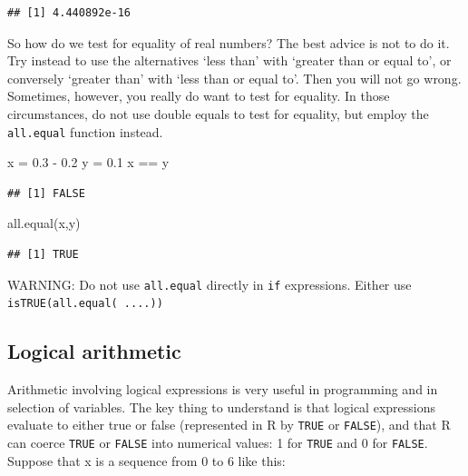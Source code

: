 \documentclass[
]{book}
\newenvironment{Shaded}{\begin{snugshade}}{\end{snugshade}}
\newcommand{\FloatTok}[1]{\textcolor[rgb]{0.00,0.00,0.81}{#1}}
\newcommand{\FunctionTok}[1]{\textcolor[rgb]{0.00,0.00,0.00}{#1}}
\newcommand{\NormalTok}[1]{#1}
\newcommand{\OtherTok}[1]{\textcolor[rgb]{0.56,0.35,0.01}{#1}}
\newcommand{\SpecialCharTok}[1]{\textcolor[rgb]{0.00,0.00,0.00}{#1}}
\begin{document}
\begin{verbatim}
## [1] 4.440892e-16
\end{verbatim}

So how do we test for equality of real numbers? The best advice is not to do it. Try instead to use the alternatives `less than' with `greater than or equal to', or conversely `greater than' with `less than or equal to'. Then you will not go wrong. Sometimes, however, you really do want to test for equality. In those circumstances, do not use double equals to test for equality, but employ the \texttt{all.equal} function instead.

\begin{Shaded}
\begin{Highlighting}[]
\NormalTok{x }\OtherTok{=} \FloatTok{0.3} \SpecialCharTok{{-}} \FloatTok{0.2}
\NormalTok{y }\OtherTok{=} \FloatTok{0.1}
\NormalTok{x }\SpecialCharTok{==}\NormalTok{ y}
\end{Highlighting}
\end{Shaded}

\begin{verbatim}
## [1] FALSE
\end{verbatim}

\begin{Shaded}
\begin{Highlighting}[]
\FunctionTok{all.equal}\NormalTok{(x,y)}
\end{Highlighting}
\end{Shaded}

\begin{verbatim}
## [1] TRUE
\end{verbatim}

WARNING: Do not use \texttt{all.equal} directly in \texttt{if} expressions. Either use \texttt{isTRUE(all.equal(\ ....))}

\hypertarget{logical-arithmetic}{%
\subsection{Logical arithmetic}\label{logical-arithmetic}}

Arithmetic involving logical expressions is very useful in programming and in selection of variables. The key thing to understand is that logical expressions evaluate to either true or false (represented in R by \texttt{TRUE} or \texttt{FALSE}), and that R can coerce \texttt{TRUE} or \texttt{FALSE} into numerical values: 1 for \texttt{TRUE} and 0 for \texttt{FALSE}. Suppose that x is a sequence from 0 to 6 like this:
\end{document}
